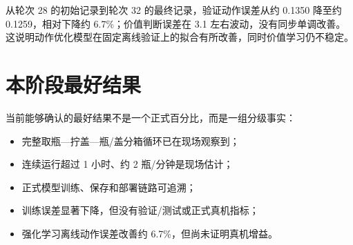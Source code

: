 从轮次 28 的初始记录到轮次 32 的最终记录，验证动作误差从约 0.1350 降至约 0.1259，相对下降约 6.7\%；价值判断误差在 3.1 左右波动，没有同步单调改善。 这说明动作优化模型在固定离线验证上的拟合有所改善，同时价值学习仍不稳定。


\section{本阶段最好结果}

当前能够确认的最好结果不是一个正式百分比，而是一组分级事实：

\begin{itemize}
  \item 完整取瓶—拧盖—瓶/盖分箱循环已在现场观察到；
  \item 连续运行超过 1 小时、约 2 瓶/分钟是现场估计；
  \item 正式模型训练、保存和部署链路可追溯；
  \item 训练误差显著下降，但没有验证/测试或正式真机指标；
  \item 强化学习离线动作误差改善约 6.7\%，但尚未证明真机增益。
\end{itemize}

